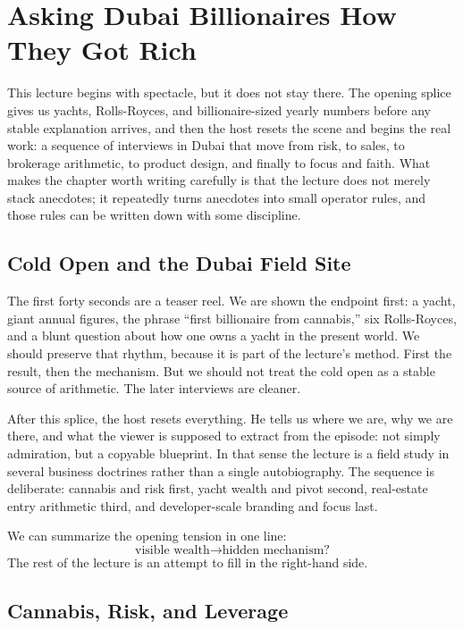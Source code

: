 \chapter{Asking Dubai Billionaires How They Got Rich}

This lecture begins with spectacle, but it does not stay there. The opening splice gives us yachts, Rolls-Royces, and billionaire-sized yearly numbers before any stable explanation arrives, and then the host resets the scene and begins the real work: a sequence of interviews in Dubai that move from risk, to sales, to brokerage arithmetic, to product design, and finally to focus and faith. What makes the chapter worth writing carefully is that the lecture does not merely stack anecdotes; it repeatedly turns anecdotes into small operator rules, and those rules can be written down with some discipline.

\section{Cold Open and the Dubai Field Site}

The first forty seconds are a teaser reel. We are shown the endpoint first: a yacht, giant annual figures, the phrase ``first billionaire from cannabis,'' six Rolls-Royces, and a blunt question about how one owns a yacht in the present world. We should preserve that rhythm, because it is part of the lecture's method. First the result, then the mechanism. But we should not treat the cold open as a stable source of arithmetic. The later interviews are cleaner.

After this splice, the host resets everything. He tells us where we are, why we are there, and what the viewer is supposed to extract from the episode: not simply admiration, but a copyable blueprint. In that sense the lecture is a field study in several business doctrines rather than a single autobiography. The sequence is deliberate: cannabis and risk first, yacht wealth and pivot second, real-estate entry arithmetic third, and developer-scale branding and focus last.

We can summarize the opening tension in one line:
\begin{equation}
\text{visible wealth} \to \text{hidden mechanism?}
\end{equation}
The rest of the lecture is an attempt to fill in the right-hand side.

\section{Cannabis, Risk, and Leverage}

